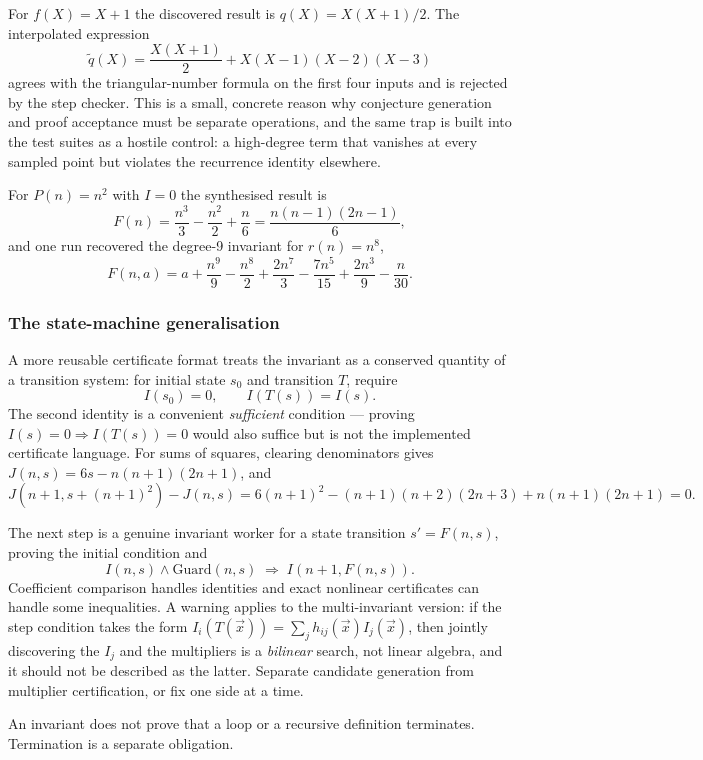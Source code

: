For $f(X)=X+1$ the discovered result is $q(X)=X(X+1)/2$. The interpolated
expression
\[
\widetilde q(X)=\frac{X(X+1)}2+X(X-1)(X-2)(X-3)
\]
agrees with the triangular-number formula on the first four inputs and is
rejected by the step checker. This is a small, concrete reason why conjecture
generation and proof acceptance must be separate operations, and the same trap
is built into the test suites as a hostile control: a high-degree term that
vanishes at every sampled point but violates the recurrence identity elsewhere.

For $P(n)=n^2$ with $I=0$ the synthesised result is
\[
 F(n)=\frac{n^3}{3}-\frac{n^2}{2}+\frac n6=\frac{n(n-1)(2n-1)}6,
\]
and one run recovered the degree-9 invariant for $r(n)=n^8$,
\[
F(n,a)=a+\frac{n^9}{9}-\frac{n^8}{2}+\frac{2n^7}{3}
 -\frac{7n^5}{15}+\frac{2n^3}{9}-\frac{n}{30}.
\]

\subsubsection*{The state-machine generalisation}

A more reusable certificate format treats the invariant as a conserved quantity
of a transition system: for initial state $s_0$ and transition $T$, require
\[
 I(s_0)=0,\qquad I(T(s))=I(s).
\]
The second identity is a convenient \emph{sufficient} condition --- proving
$I(s)=0\Rightarrow I(T(s))=0$ would also suffice but is not the implemented
certificate language. For sums of squares, clearing denominators gives
$J(n,s)=6s-n(n+1)(2n+1)$, and
\[
 J(n+1,s+(n+1)^2)-J(n,s)
 =6(n+1)^2-(n+1)(n+2)(2n+3)+n(n+1)(2n+1)=0 .
\]

The next step is a genuine invariant worker for a state transition
$s'=F(n,s)$, proving the initial condition and
\[
 I(n,s)\land\mathrm{Guard}(n,s)\;\Longrightarrow\;I(n+1,F(n,s)).
\]
Coefficient comparison handles identities and exact nonlinear certificates can
handle some inequalities. A warning applies to the multi-invariant version: if
the step condition takes the form $I_i(T(\vec x))=\sum_j h_{ij}(\vec x)I_j(\vec
x)$, then jointly discovering the $I_j$ and the multipliers is a
\emph{bilinear} search, not linear algebra, and it should not be described as
the latter. Separate candidate generation from multiplier certification, or fix
one side at a time.

\begin{remark}
An invariant does not prove that a loop or a recursive definition terminates.
Termination is a separate obligation.
\end{remark}

